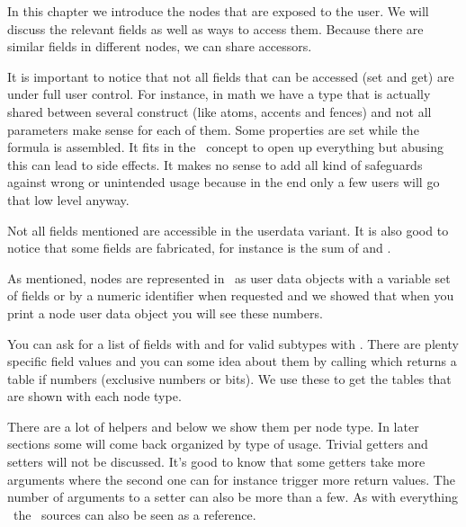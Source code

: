 In this chapter we introduce the nodes that are exposed to the user. We will
discuss the relevant fields as well as ways to access them. Because there are
similar fields in different nodes, we can share accessors.

It is important to notice that not all fields that can be accessed (set and get)
are under full user control. For instance, in math we have a  type
that is actually shared between several construct (like atoms, accents and
fences) and not all parameters make sense for each of them. Some properties are
set while the formula is assembled. It fits in the \LUAMETATEX\ concept to open
up everything but abusing this can lead to side effects. It makes no sense to add
all kind of safeguards against wrong or unintended usage because in the end only
a few users will go that low level anyway.

Not all fields mentioned are accessible in the userdata variant. It is also good
to notice that some fields are fabricated, for instance  is the sum
of  and .

\stopsection

\startsection[title={\LUA\ node representation}]

As mentioned, nodes are represented in \LUA\ as user data objects with a variable
set of fields or by a numeric identifier when requested and we showed that when
you print a node user data object you will see these numbers.

\startfourrows
{}
\stopfourrows

You can ask for a list of fields with  and for valid subtypes
with . There are plenty specific field values and you can
some idea about them by calling  which returns a table if
numbers (exclusive numbers or bits). We use these to get the tables that are
shown with each node type.

There are a lot of helpers and below we show them per node type. In later
sections some will come back organized by type of usage. Trivial getters and
setters will not be discussed. It's good to know that some getters take more
arguments where the second one can for instance trigger more return values. The
number of arguments to a setter can also be more than a few. As with everything
\LUAMETATEX\ the \CONTEXT\ sources can also be seen as  a reference.

\stopsection

\startsection[title={Main text nodes}]

